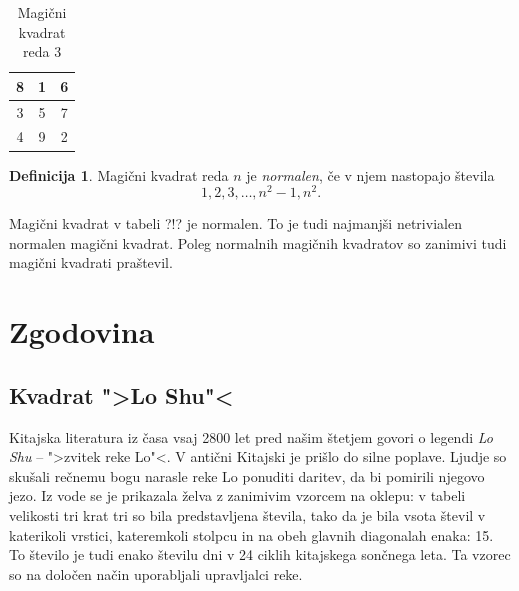\documentclass[a4paper,12pt]{article}
\theoremstyle{definition}
\newtheorem{definicija}{Definicija}
\theoremstyle{plain}
\begin{document}

\begin{table}
   \centering
   \caption{Magični kvadrat reda 3}
   \label{table:mag3}
   \large
   \begin{tabular}{|c|c|c|}
      \hline
         8 & 1 & 6 \\ \hline
         3 & 5 & 7 \\ \hline
         4 & 9 & 2 \\ \hline
   \end{tabular}
   \normalsize
\end{table}

 \begin{definicija}
   Magični kvadrat reda $n$ je \emph{normalen}, če v njem nastopajo števila
   \begin{equation}
      \label{eq:numbers}
      1, 2, 3, \ldots, n^2-1, n^2.
   \end{equation}
\end{definicija}

Magični kvadrat v tabeli ?!? je normalen.
To je tudi najmanjši netrivialen normalen magični kvadrat.
Poleg normalnih magičnih kvadratov so zanimivi tudi magični kvadrati praštevil.


\section{Zgodovina}

\subsection{Kvadrat ">Lo Shu"<}

Kitajska literatura iz časa vsaj 2800 let pred našim štetjem govori o legendi
\emph{Lo Shu} -- ">zvitek reke Lo"<. V antični Kitajski je prišlo do
silne poplave. Ljudje so skušali rečnemu bogu narasle reke Lo ponuditi daritev,
da bi pomirili njegovo jezo. Iz vode se je prikazala želva z zanimivim vzorcem
na oklepu: v tabeli velikosti tri krat tri so bila predstavljena števila, tako
da je bila vsota števil v katerikoli vrstici, kateremkoli stolpcu in na obeh
glavnih diagonalah enaka: 15. To število je tudi enako številu dni v 24 ciklih
kitajskega sončnega leta. Ta vzorec so na določen način uporabljali upravljalci
reke.

\end{document}
